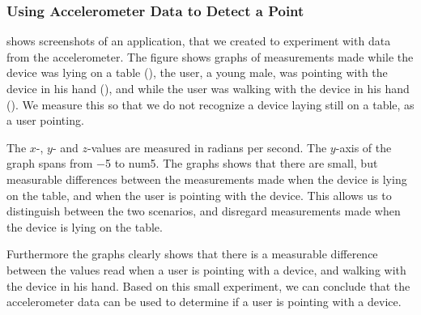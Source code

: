 \subsubsection{Using Accelerometer Data to Detect a Point}

 shows screenshots of an application, 
that we created to experiment with data from the accelerometer. 
The figure shows graphs of measurements made while the device was lying on a table (), 
the user, a young male, was pointing with the device in his hand (), 
and while the user was walking with the device in his hand ().
We measure this so that we do not recognize a device laying still on a table, 
as a user pointing.
 
The $x$-, $y$- and $z$-values are measured in radians per second. 
The $y$-axis of the graph spans from \num{-5} to num{5}. 
The graphs shows that there are small, 
but measurable differences between the measurements made when the device is lying on the table,
and when the user is pointing with the device. 
This allows us to distinguish between the two scenarios, 
and disregard measurements made when the device is lying on the table. 

Furthermore the graphs clearly shows that there is a measurable difference between the values read when a user is pointing with a device, 
and walking with the device in his hand. 
Based on this small experiment, 
we can conclude that the accelerometer data can be used to determine if a user is pointing with a device.

